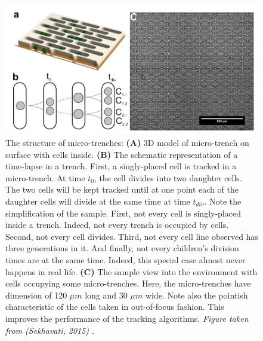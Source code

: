 \documentclass[pdftex,12pt,a4paper]{report}
\begin{document}
\begin{figure}[H]
\centering
\includegraphics[width=1\textwidth]{images/trenches-sekhavati}
\caption{The structure of micro-trenches: \textbf{(A)} 3D model of micro-trench on surface with cells inside. \textbf{(B)} The schematic representation of a time-lapse in a trench. First, a singly-placed cell is tracked in a micro-trench. At time $t_0$, the cell divides into two daughter cells. The two cells will be kept tracked until at one point each of the daughter cells will divide at the same time at time $t_{div}$. Note the simplification of the sample. First, not every cell is singly-placed inside a trench. Indeed, not every trench is occupied by cells. Second, not every cell divides. Third, not every cell line observed has three generations in it. And finally, not every children's division times are at the same time. Indeed, this special case almost never happens in real life. \textbf{(C)} The sample view into the environment with cells occupying some micro-trenches. Here, the micro-trenches have dimension of 120 $\mu m$ long and 30 $\mu m$ wide. Note also the pointish characteristic of the cells taken in out-of-focus fashion. This improves the performance of the tracking algorithms. \textit{Figure taken from (Sekhavati, 2015) \cite{sekhavati2015dynamic}}.}
\label{fig:microtrench_design}
\end{figure}
\end{document}
